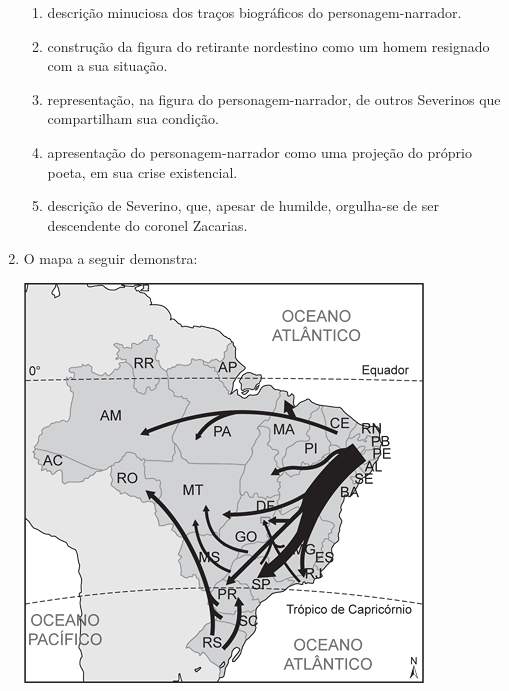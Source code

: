 \documentclass[10pt,a4paper]{article}
\newenvironment{Figure}
  {\par\medskip\noindent\minipage{\linewidth}}
  {\endminipage\par\medskip}
\begin{document}
\begin{multicols}{2}
\begin{enumerate}
\begin{quote}
	\end{quote}
		\begin{enumerate}
		\item descri\c{c}\~ao minuciosa dos tra\c{c}os biogr\'aficos do personagem-narrador.
		\item constru\c{c}\~ao da figura do retirante nordestino como um homem resignado com a sua situa\c{c}\~ao.
		\item representa\c{c}\~ao, na figura do personagem-narrador, de outros Severinos que compartilham sua condi\c{c}\~ao.
		\item apresenta\c{c}\~ao do personagem-narrador como uma proje\c{c}\~ao do pr\'oprio poeta, em sua crise existencial.
		\item descri\c{c}\~ao de Severino, que, apesar de humilde, orgulha-se de ser descendente do coronel Zacarias.
		\end{enumerate}



	\item O mapa a seguir demonstra:

\begin{Figure}
     \includegraphics[width=\linewidth]{mapa_brasil_geografia.jpg}
\end{Figure}


\end{enumerate}
\end{multicols}
\end{document}
